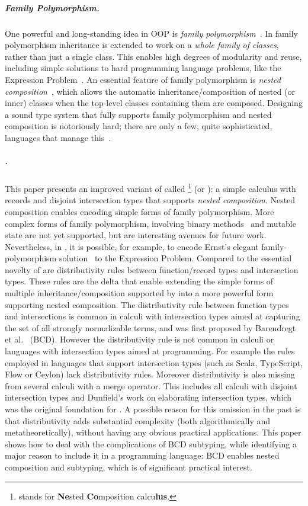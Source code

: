 \subparagraph{Family Polymorphism.}
One powerful and long-standing idea in OOP is \emph{family
  polymorphism}~\cite{Ernst_2001}. In family polymorphism inheritance is
extended to work on a \emph{whole family of classes}, rather than just a single
class. This enables high degrees of modularity and
reuse, including simple solutions to hard programming language problems, like
the Expression Problem~\cite{wadler1998expression}. An essential feature of
family polymorphism is \emph{nested composition}~\cite{Corradi_2012,
  ErnstVirtual, Nystrom_2004}, which allows the automatic
inheritance/composition of nested (or inner) classes when the top-level classes
containing them are composed. Designing a sound type system that fully supports family
polymorphism and nested composition is notoriously hard; there are only
a few, quite sophisticated, languages that manage this~\cite{ErnstVirtual, Nystrom_2004, pubsdoc:tribe-virtual-calculus, SAITO_2007}.

\subparagraph{\name.}
This paper presents an improved variant of \oname called
\name\footnote{\name stands for \textbf{Ne}sted \textbf{Co}mposition
  calcu\textbf{lus}.} (or \namee): a simple calculus with records and
disjoint intersection types that supports \emph{nested composition}. Nested composition enables
encoding simple forms of family polymorphism. More complex forms of
family polymorphism, involving binary methods~\cite{bruce1995binary} and mutable state are
not yet supported, but are interesting avenues for future work.
Nevertheless, in \name, it is
possible, for example, to encode Ernst's elegant family-polymorphism solution~\cite{Ernst_2001} to
the Expression Problem. 
Compared to \oname the essential novelty of \name are
distributivity rules between function/record types and intersection
types. These rules are the delta that enable extending the simple
forms of multiple inheritance/composition supported by \oname into a
more powerful form supporting nested composition. The distributivity
rule between function types and intersections is
common in calculi with intersection types aimed at capturing the set
of all strongly normalizable terms, and was first proposed by
Barendregt et al.~\cite{Barendregt_1983} (BCD). However the
distributivity rule is not common in calculi or languages with intersection types
aimed at programming. For example the rules employed in languages that
support intersection types (such as Scala, TypeScript, Flow or Ceylon)
lack distributivity rules. Moreover distributivity is also missing from
several calculi with a merge operator. This includes all calculi with
disjoint intersection types and Dunfield's work on elaborating
intersection types, which was the original foundation for \oname.
A possible reason for this omission in the past is that distributivity adds
substantial complexity (both algorithmically and metatheoretically), without having any obvious practical
applications. 
This paper shows how to deal with the complications of BCD subtyping, while
identifying a major reason to include it in a programming
language: BCD enables nested composition and subtyping, which is of
significant practical interest.

